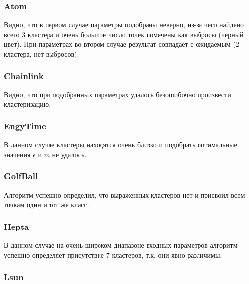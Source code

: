 \subsubsection{Atom}


Видно, что в первом случае параметры подобраны неверно, из-за чего найдено всего 3 кластера и очень большое число точек помечены как выбросы (черный цвет). При параметрах во втором случае результат совпадает с ожидаемым (2 кластера, нет выбросов).

\subsubsection{Chainlink}


Видно, что при подобранных параметрах удалось безошибочно произвести кластеризацию.

\subsubsection{EngyTime}


В данном случае кластеры находятся очень близко и подобрать оптимальные значения $\epsilon$ и $m$ не удалось.

\subsubsection{GolfBall}


Алгоритм успешно определил, что выраженных кластеров нет и присвоил всем точкам один и тот же класс.

\newpage

\subsubsection{Hepta}


В данном случае на очень широком диапазоне входных параметров алгоритм успешно определяет присутствие 7 кластеров, т.к. они явно различимы.

\subsubsection{Lsun}

